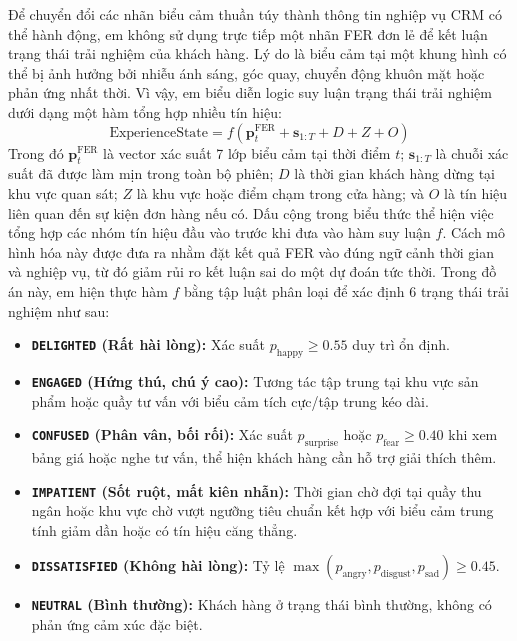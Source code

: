 Để chuyển đổi các nhãn biểu cảm thuần túy thành thông tin nghiệp vụ CRM có thể hành động, em không sử dụng trực tiếp một nhãn FER đơn lẻ để kết luận trạng thái trải nghiệm của khách hàng. Lý do là biểu cảm tại một khung hình có thể bị ảnh hưởng bởi nhiễu ánh sáng, góc quay, chuyển động khuôn mặt hoặc phản ứng nhất thời. Vì vậy, em biểu diễn logic suy luận trạng thái trải nghiệm dưới dạng một hàm tổng hợp nhiều tín hiệu:
\begin{equation}
\text{ExperienceState} = f(\bm{p}^{\text{FER}}_t + \bm{s}_{1:T} + D + Z + O)
\end{equation}
Trong đó $\bm{p}^{\text{FER}}_t$ là vector xác suất 7 lớp biểu cảm tại thời điểm $t$; $\bm{s}_{1:T}$ là chuỗi xác suất đã được làm mịn trong toàn bộ phiên; $D$ là thời gian khách hàng dừng tại khu vực quan sát; $Z$ là khu vực hoặc điểm chạm trong cửa hàng; và $O$ là tín hiệu liên quan đến sự kiện đơn hàng nếu có. Dấu cộng trong biểu thức thể hiện việc tổng hợp các nhóm tín hiệu đầu vào trước khi đưa vào hàm suy luận $f$. Cách mô hình hóa này được đưa ra nhằm đặt kết quả FER vào đúng ngữ cảnh thời gian và nghiệp vụ, từ đó giảm rủi ro kết luận sai do một dự đoán tức thời. Trong đồ án này, em hiện thực hàm $f$ bằng tập luật phân loại để xác định 6 trạng thái trải nghiệm như sau:
\begin{itemize}
    \item \textbf{\texttt{DELIGHTED} (Rất hài lòng):} Xác suất $p_{\text{happy}} \ge 0.55$ duy trì ổn định.
    \item \textbf{\texttt{ENGAGED} (Hứng thú, chú ý cao):} Tương tác tập trung tại khu vực sản phẩm hoặc quầy tư vấn với biểu cảm tích cực/tập trung kéo dài.
    \item \textbf{\texttt{CONFUSED} (Phân vân, bối rối):} Xác suất $p_{\text{surprise}}$ hoặc $p_{\text{fear}} \ge 0.40$ khi xem bảng giá hoặc nghe tư vấn, thể hiện khách hàng cần hỗ trợ giải thích thêm.
    \item \textbf{\texttt{IMPATIENT} (Sốt ruột, mất kiên nhẫn):} Thời gian chờ đợi tại quầy thu ngân hoặc khu vực chờ vượt ngưỡng tiêu chuẩn kết hợp với biểu cảm trung tính giảm dần hoặc có tín hiệu căng thẳng.
    \item \textbf{\texttt{DISSATISFIED} (Không hài lòng):} Tỷ lệ $\max(p_{\text{angry}}, p_{\text{disgust}}, p_{\text{sad}}) \ge 0.45$.
    \item \textbf{\texttt{NEUTRAL} (Bình thường):} Khách hàng ở trạng thái bình thường, không có phản ứng cảm xúc đặc biệt.
\end{itemize}

